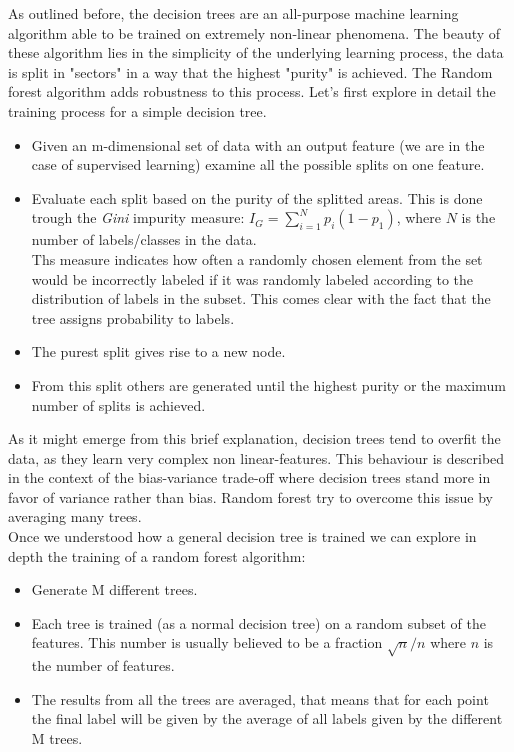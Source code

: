As outlined before, the decision trees are an all-purpose machine learning algorithm able to be trained on extremely non-linear phenomena. The beauty of these algorithm lies in the simplicity of the underlying learning process, the data is split in "sectors" in a way that the highest "purity" is achieved. The Random forest algorithm adds robustness to this process. Let's first explore in detail the training process for a simple decision tree.\\

\begin{itemize}
	\item  Given an m-dimensional set of data with an output feature (we are in the case of supervised learning) examine all the possible splits on one feature.
	\item Evaluate each split based on the purity of the splitted areas. This is done trough the \textit{Gini} impurity measure: $I_G = \sum\limits_{i=1}^N p_i(1-p_1)$, where $N$ is the number of labels/classes in the data.\\
	Ths measure indicates how often a randomly chosen element from the set would be incorrectly labeled if it was randomly labeled according to the distribution of labels in the subset. This comes clear with the fact that the tree assigns probability to labels.
	\item The purest split gives rise to a new node.
	\item From this split others are generated until the highest purity or the maximum number of splits is achieved.\\
\end{itemize}

As it might emerge from this brief explanation, decision trees tend to overfit the data, as they learn very complex non linear-features. This behaviour is described in the context of the bias-variance trade-off where decision trees stand more in favor of variance rather than bias. Random forest try to overcome this issue by averaging many trees.\\
Once we understood how a general decision tree is trained we can explore in depth the training of a random forest algorithm:

\begin{itemize}
	\item Generate M different trees.
	\item Each tree is trained (as a normal decision tree) on a random subset of the features. This number is usually believed to be a fraction $\sqrt{n}/n$ where $n$ is the number of features.
	\item The results from all the trees are averaged, that means that for each point the final label will be given by the average of all labels given by the different M trees. 
\end{itemize}

